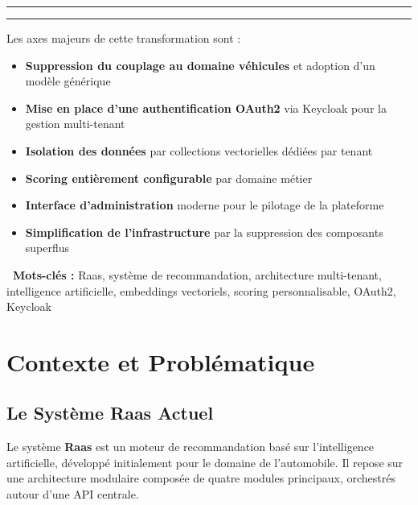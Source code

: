 \documentclass[11pt,a4paper]{report}
\newcommand{\concept}[1]{\textcolor{raasPrimary}{\textbf{#1}}}
\newcommand{\elegantsep}{\begin{center}\vspace{10pt}\textcolor{raasGray300}{\rule{0.2\textwidth}{0.5pt}\hspace{10pt}\textcolor{raasAccent}{\faDiamond}\hspace{10pt}\rule{0.2\textwidth}{0.5pt}}\vspace{10pt}\end{center}}
\begin{document}
\elegantsep

Les axes majeurs de cette transformation sont :
\begin{itemize}
    \item \textbf{Suppression du couplage au domaine véhicules} et adoption d'un modèle générique
    \item \textbf{Mise en place d'une authentification OAuth2} via Keycloak pour la gestion multi-tenant
    \item \textbf{Isolation des données} par collections vectorielles dédiées par tenant
    \item \textbf{Scoring entièrement configurable} par domaine métier
    \item \textbf{Interface d'administration} moderne pour le pilotage de la plateforme
    \item \textbf{Simplification de l'infrastructure} par la suppression des composants superflus
\end{itemize}

\begin{processbox}
\textbf{\textcolor{raasPrimary}{\faTags\ Mots-clés :}} Raas, système de recommandation, architecture multi-tenant, intelligence artificielle, embeddings vectoriels, scoring personnalisable, OAuth2, Keycloak
\end{processbox}


\newpage
\tableofcontents
\newpage
\listoffigures
\newpage
\listoftables


\chapter{Contexte et Problématique}

\section{Le Système Raas Actuel}

Le système \concept{Raas} est un moteur de recommandation basé sur l'intelligence artificielle, développé initialement pour le domaine de l'automobile. Il repose sur une architecture modulaire composée de quatre modules principaux, orchestrés autour d'une API centrale.
\end{document}
